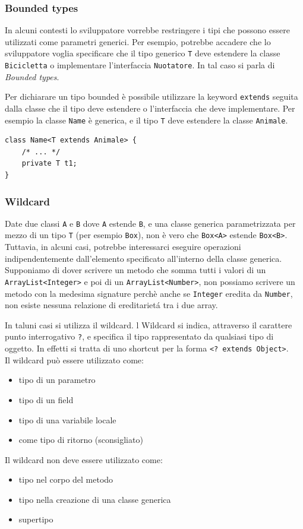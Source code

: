 \documentclass{article}
\begin{document}
\subsubsection{Bounded types}
In alcuni contesti lo sviluppatore vorrebbe restringere i tipi che possono essere utilizzati come parametri generici. Per esempio, potrebbe accadere che lo sviluppatore voglia specificare che il tipo generico \texttt{T} deve estendere la classe \texttt{Bicicletta} o implementare l'interfaccia \texttt{Nuotatore}. In tal caso si parla di \emph{Bounded types}.

Per dichiarare un tipo bounded \`e possibile utilizzare la keyword \texttt{extends} seguita dalla classe che il tipo deve estendere o l'interfaccia che deve implementare. Per esempio la classe \texttt{Name} \`e generica, e il tipo \texttt{T} deve estendere la classe \texttt{Animale}.

\begin{lstlisting}
class Name<T extends Animale> { 
    /* ... */
    private T t1;
}
\end{lstlisting}

\subsubsection{Wildcard}
Date due classi \texttt{A} e \texttt{B} dove \texttt{A} estende \texttt{B}, e una classe generica parametrizzata per mezzo di un tipo \texttt{T} (per esempio \texttt{Box}), non \`e vero che \texttt{Box<A>} estende \texttt{Box<B>}. Tuttavia, in alcuni casi, potrebbe interessarci eseguire operazioni indipendentemente dall'elemento specificato all'interno della classe generica. Supponiamo di dover scrivere un metodo che somma tutti i valori di un \texttt{ArrayList<Integer>} e poi di un \texttt{ArrayList<Number>}, non possiamo scrivere un metodo con la medesima signature perch\`e anche se \texttt{Integer} eredita da \texttt{Number}, non esiste nessuna relazione di ereditariet\'a tra i due array.

In taluni casi si utilizza il wildcard. l Wildcard si indica, attraverso il carattere punto interrogativo \texttt{?}, e specifica il tipo rappresentato da qualsiasi tipo di oggetto. In effetti si tratta di uno shortcut per la forma \texttt{<? extends Object>}. \\
Il wildcard pu\`o essere utilizzato come: 
\begin{itemize}
\item tipo di un parametro
\item tipo di un field
\item tipo di una variabile locale
\item come tipo di ritorno (sconsigliato)
\end{itemize}
Il wildcard non deve essere utilizzato come:
\begin{itemize}
\item tipo nel corpo del metodo
\item tipo nella creazione di una classe generica 
\item supertipo
\end{itemize}
\end{document}
